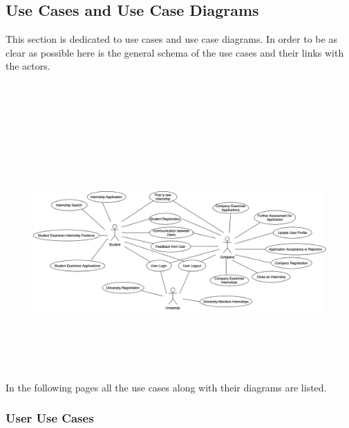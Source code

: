 \newpage

\subsection{Use Cases and Use Case Diagrams}

    This section is dedicated to use cases and use case diagrams. In order to be as clear as possible here is the general schema of the use cases and their links with the actors. 
\\
\\
\\
\\
\\
\\
\\
\\
\\
    \begin{figure}[h!]
                \centering
                    \includegraphics[width=1\textwidth]{RASD/Images/GeneralSchemaUS.drawio.png}
                \label{fig:example}
            \end{figure}
\\
\\
\\
\\
In the following pages all the use cases along with their diagrams are listed.
\newpage
    \subsubsection{User Use Cases}
    
